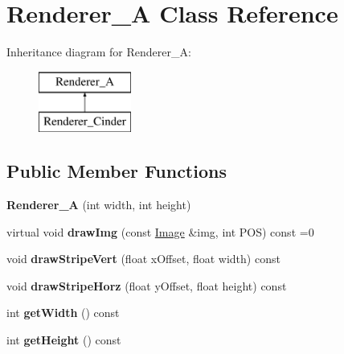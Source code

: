 \hypertarget{class_renderer___a}{\section{Renderer\-\_\-\-A Class Reference}
\label{class_renderer___a}
}
Inheritance diagram for Renderer\-\_\-\-A\-:\begin{figure}[H]
\begin{center}
\leavevmode
\includegraphics[height=2.000000cm]{class_renderer___a}
\end{center}
\end{figure}
\subsection*{Public Member Functions}
\begin{DoxyCompactItemize}
\item 
\hypertarget{class_renderer___a_afaef918b4d9abdb929d9a437d00e3eb8}{{\bfseries Renderer\-\_\-\-A} (int width, int height)}\label{class_renderer___a_afaef918b4d9abdb929d9a437d00e3eb8}

\item 
\hypertarget{class_renderer___a_a9702e174f4c76edd6059e3593ce03291}{virtual void {\bfseries draw\-Img} (const \hyperlink{class_image}{Image} \&img, int P\-O\-S) const =0}\label{class_renderer___a_a9702e174f4c76edd6059e3593ce03291}

\item 
\hypertarget{class_renderer___a_af817037b1ebd9906e5f4faee1637bdf0}{void {\bfseries draw\-Stripe\-Vert} (float x\-Offset, float width) const }\label{class_renderer___a_af817037b1ebd9906e5f4faee1637bdf0}

\item 
\hypertarget{class_renderer___a_a70ea4a1396787e8a3c59c848a6aeabcd}{void {\bfseries draw\-Stripe\-Horz} (float y\-Offset, float height) const }\label{class_renderer___a_a70ea4a1396787e8a3c59c848a6aeabcd}

\item 
\hypertarget{class_renderer___a_a79fb640a6c4a733647f3bc5cd96c3bad}{int {\bfseries get\-Width} () const }\label{class_renderer___a_a79fb640a6c4a733647f3bc5cd96c3bad}

\item 
\hypertarget{class_renderer___a_a69aeb74354637f5d9d7a5508f00dde33}{int {\bfseries get\-Height} () const }\label{class_renderer___a_a69aeb74354637f5d9d7a5508f00dde33}

\end{DoxyCompactItemize}
